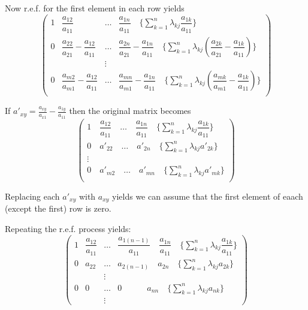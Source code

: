 \documentclass[11pt,a4paper]{article}
\begin{document}
\begin {enumerate}
Now r.e.f. for the first element in each row yields  \[\left( \begin{array}{cccc}
1 & \dfrac{a_{12}}{a_{11}} & \ldots & \dfrac{a_{1n}}{a_{11}} \quad \{\displaystyle\sum_{k=1}^{n} \lambda_{kj}\dfrac{a_{1k}}{a_{11}}\}\\
0 & \dfrac{a_{22}}{a_{21}}-\dfrac{a_{12}}{a_{11}} & \ldots & \dfrac{a_{2n}}{a_{21}}-\dfrac{a_{1n}}{a_{11}} \quad \{\displaystyle\sum_{k=1}^{n} \lambda_{kj}(\dfrac{a_{2k}}{a_{21}}-\dfrac{a_{1k}}{a_{11}})\}\\
& &\vdots\\
0 & \dfrac{a_{m2}}{a_{m1}}-\dfrac{a_{12}}{a_{11}} & \ldots & \dfrac{a_{mn}}{a_{m1}}-\dfrac{a_{1n}}{a_{11}} \quad \{\displaystyle\sum_{k=1}^{n} \lambda_{kj}(\dfrac{a_{mk}}{a_{m1}}-\dfrac{a_{1k}}{a_{11}})\}\\
\end{array} \right)\]

If $a'_{xy}=\frac{a_{xy}}{a_{x1}}-\frac{a_{1y}}{a_{11}}$ then the original matrix becomes \[\left( \begin{array}{cccc}
1 \quad \dfrac{a_{12}}{a_{11}} \quad \ldots \quad \dfrac{a_{1n}}{a_{11}} \quad \{\displaystyle\sum_{k=1}^{n} \lambda_{kj}\dfrac{a_{1k}}{a_{11}}\}\\
0 \quad a'_{22}\quad \ldots \quad a'_{2n} \quad \{\displaystyle\sum_{k=1}^{n} \lambda_{kj}a'_{2k}\}\\
\vdots\\
0 \quad a'_{m2}\quad \ldots \quad a'_{mn} \quad \{\displaystyle\sum_{k=1}^{n} \lambda_{kj}a'_{mk}\}\\
\end{array} \right)\]

Replacing each $a'_{xy}$ with $a_{xy}$ yields we can assume that the first element of eaach (except the first) row is zero.

Repeating the r.e.f. process yields: \[\left( \begin{array}{cccc}
1 & \dfrac{a_{12}}{a_{11}} & \ldots & \dfrac{a_{1(n-1)}}{a_{11}} \quad \dfrac{a_{1n}}{a_{11}} \quad \{\displaystyle\sum_{k=1}^{n} \lambda_{kj}\dfrac{a_{1k}}{a_{11}}\}\\
0 & a_{22}& \ldots & a_{2(n-1)} \quad  a_{2n} \quad \{\displaystyle\sum_{k=1}^{n} \lambda_{kj}a_{2k}\}\\
& &\vdots\\
0 & 0 & \ldots & 0 \quad\qquad a_{nn} \quad \{\displaystyle\sum_{k=1}^{n} \lambda_{kj}a_{nk}\}\\
& &\vdots
\end{array} \right)\]


\end{enumerate}
\end{document}
